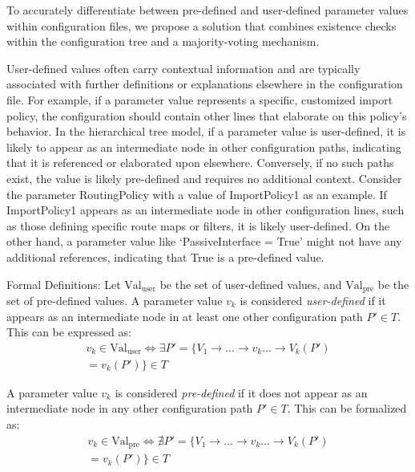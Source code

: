  
To accurately differentiate between pre-defined and user-defined parameter values within configuration files, we propose a solution that combines existence checks within the configuration tree and a majority-voting mechanism.

User-defined values often carry contextual information  and are typically associated with further definitions or explanations elsewhere in the configuration file. For example, if a parameter value represents a specific, customized import policy, the configuration should contain other lines that elaborate on this policy's behavior. In the hierarchical tree model, if a parameter value is user-defined, it is likely to  appear as an intermediate node in other configuration paths, indicating that it is referenced or elaborated upon elsewhere. Conversely, if no such paths exist, the value is likely pre-defined and requires no additional context. Consider the parameter RoutingPolicy with a value of ImportPolicy1 as an example. If ImportPolicy1 appears as an intermediate node in other configuration lines, such as those defining specific route maps or filters, it is likely user-defined. On the other hand, a parameter value like `PassiveInterface = True' might not have any additional references, indicating that True is a pre-defined value.

Formal Definitions:
Let \( \text{Val}_{\text{user}} \) be the set of user-defined values, and \( \text{Val}_{\text{pre}} \) be the set of pre-defined values.
A parameter value \( v_k \) is considered \textit{user-defined} if it appears as an intermediate node in at least one other configuration path \( P' \in T \). This can be expressed as:
\begin{multline*}
v_k \in \text{Val}_{\text{user}} \iff \exists P' = \{ V_1 \rightarrow \dots \rightarrow v_k \dots \rightarrow V_k(P') \\ = v_k(P') \} \in T
\end{multline*}

A parameter value \( v_k \) is considered \textit{pre-defined} if it does not appear as an intermediate node in any other configuration path \( P' \in T \). This can be formalized as:
\begin{multline*}
v_k \in \text{Val}_{\text{pre}} \iff \nexists P' = \{ V_1 \rightarrow \dots \rightarrow v_k \dots \rightarrow V_k(P') \\ = v_k(P') \} \in T
\end{multline*}


